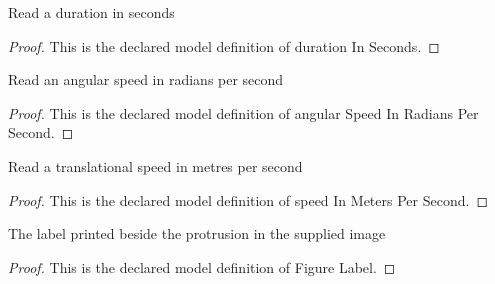\begin{definition}
  \label{def:physics:phyx-mini-0225:phyxminiproblems-problemphyxmini0225-durationinseconds}
  Read a duration in seconds
\end{definition}
\begin{proof}
  This is the declared model definition of duration In Seconds.
\end{proof}
\begin{definition}
  \label{def:physics:phyx-mini-0225:phyxminiproblems-problemphyxmini0225-angularspeedinradianspersecond}
  Read an angular speed in radians per second
\end{definition}
\begin{proof}
  This is the declared model definition of angular Speed In Radians Per Second.
\end{proof}
\begin{definition}
  \label{def:physics:phyx-mini-0225:phyxminiproblems-problemphyxmini0225-speedinmeterspersecond}
  Read a translational speed in metres per second
\end{definition}
\begin{proof}
  This is the declared model definition of speed In Meters Per Second.
\end{proof}
\begin{definition}
  \label{def:physics:phyx-mini-0225:phyxminiproblems-problemphyxmini0225-figurelabel}
  The label printed beside the protrusion in the supplied image
\end{definition}
\begin{proof}
  This is the declared model definition of Figure Label.
\end{proof}
